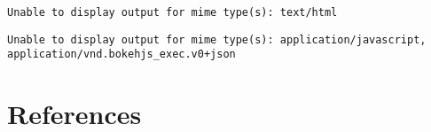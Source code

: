 \documentclass[
  letterpaper,
  DIV=11,
  numbers=noendperiod]{scrreprt}
\newlength{\cslhangindent}
\newlength{\cslentryspacingunit} %
\newenvironment{CSLReferences}[2] %
 {%
  \setlength{\parindent}{0pt}
  \ifodd #1
  \let\oldpar\par
  \def\par{\hangindent=\cslhangindent\oldpar}
  \fi
  \setlength{\parskip}{#2\cslentryspacingunit}
 }%
 {}
\begin{document}
\begin{verbatim}
Unable to display output for mime type(s): text/html
\end{verbatim}

\begin{verbatim}
Unable to display output for mime type(s): application/javascript, application/vnd.bokehjs_exec.v0+json
\end{verbatim}


\hypertarget{references}{%
\chapter*{References}\label{references}}


\hypertarget{refs}{}
\begin{CSLReferences}{0}{0}
\end{CSLReferences}
\end{document}
